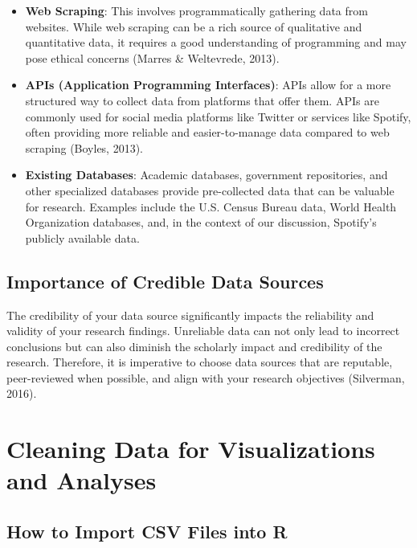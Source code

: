 \documentclass[
]{book}
\begin{document}
\begin{itemize}
\item
  \textbf{Web Scraping}: This involves programmatically gathering data from websites. While web scraping can be a rich source of qualitative and quantitative data, it requires a good understanding of programming and may pose ethical concerns (Marres \& Weltevrede, 2013).
\item
  \textbf{APIs (Application Programming Interfaces)}: APIs allow for a more structured way to collect data from platforms that offer them. APIs are commonly used for social media platforms like Twitter or services like Spotify, often providing more reliable and easier-to-manage data compared to web scraping (Boyles, 2013).
\item
  \textbf{Existing Databases}: Academic databases, government repositories, and other specialized databases provide pre-collected data that can be valuable for research. Examples include the U.S. Census Bureau data, World Health Organization databases, and, in the context of our discussion, Spotify's publicly available data.
\end{itemize}

\hypertarget{importance-of-credible-data-sources}{%
\subsection*{Importance of Credible Data Sources}\label{importance-of-credible-data-sources}}

The credibility of your data source significantly impacts the reliability and validity of your research findings. Unreliable data can not only lead to incorrect conclusions but can also diminish the scholarly impact and credibility of the research. Therefore, it is imperative to choose data sources that are reputable, peer-reviewed when possible, and align with your research objectives (Silverman, 2016).

\hypertarget{cleaning-data-for-visualizations-and-analyses}{%
\section{Cleaning Data for Visualizations and Analyses}\label{cleaning-data-for-visualizations-and-analyses}}

\hypertarget{how-to-import-csv-files-into-r}{%
\subsection*{How to Import CSV Files into R}\label{how-to-import-csv-files-into-r}}
\end{document}

